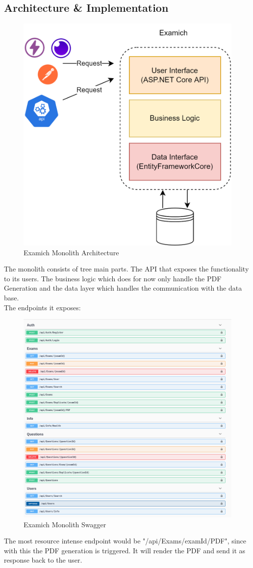\documentclass[BIF,Bachelor,nenglish]{twbook}%
\begin{document}
\subsection{Architecture \& Implementation}

\begin{figure} [H]
 \begin{center}
    \includegraphics[width=0.6\linewidth]{img/ExamichMonolith.png}
 \end{center}
 \caption{Examich Monolith Architecture}
 \label{examichMonolith}
\end{figure}

The monolith consists of tree main parts. The API that exposes the functionality to its users. The business logic which does for now only handle the PDF Generation and the data layer which handles the communication with the data base.
\\
\noindent
The endpoints it exposes:

\begin{figure} [H]
 \begin{center}
    \includegraphics[width=0.8\linewidth]{img/Monolith_Swagger.png}
 \end{center}
 \caption{Examich Monolith Swagger}
 \label{examichMonolithSwagger}
\end{figure}
\noindent
The most resource intense endpoint would be "/api/Exams/{examId}/PDF", since with this the PDF generation is triggered. It will render the PDF and send it as response back to the user.
\end{document}
